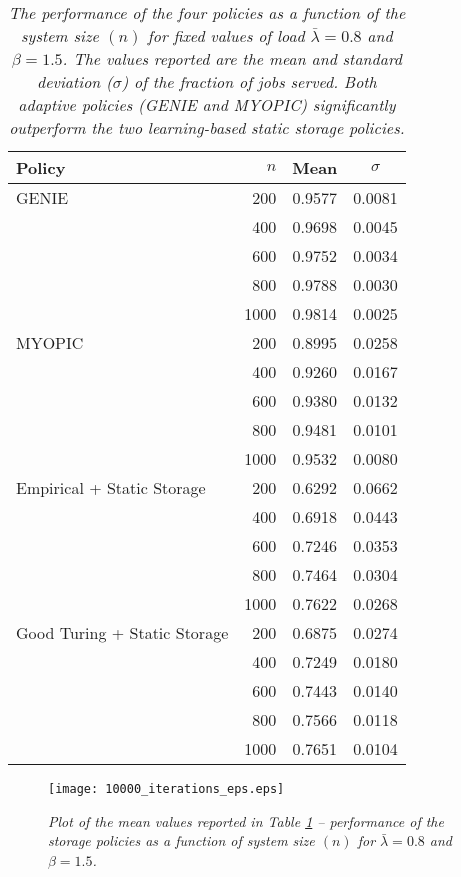 \documentclass[10pt, conference, letterpaper]{IEEEtran}
\begin{document}
\begin{table}[h]
	
	\centering
	\begin{tabular}{l r c c }
		\hline\hline
		Policy & $n$ & Mean & $\sigma$ \\ [0.5ex] \hline GENIE & 200 & 0.9577 & 0.0081  \\
		& 400 & 0.9698 & 0.0045 \\
		& 600 & 0.9752 & 0.0034 \\
		& 800 & 0.9788 & 0.0030 \\
		& 1000 & 0.9814 & 0.0025 \\
		\hline
		MYOPIC & 200 & 0.8995  & 0.0258 \\
		& 400 & 0.9260  & 0.0167  \\
		& 600 & 0.9380  & 0.0132 \\
		& 800 & 0.9481  & 0.0101 \\
		& 1000 & 0.9532 & 0.0080 \\
		\hline
		Empirical + Static Storage & 200 & 0.6292 & 0.0662  \\
		& 400 & 0.6918 & 0.0443 \\
		& 600 & 0.7246 & 0.0353 \\
		& 800 & 0.7464 & 0.0304 \\
		& 1000 & 0.7622 & 0.0268 \\
		\hline
		Good Turing + Static Storage & 200 & 0.6875 & 0.0274  \\
		& 400 & 0.7249 & 0.0180  \\
		& 600 & 0.7443 & 0.0140 \\
		& 800 & 0.7566 & 0.0118 \\
		& 1000 & 0.7651 & 0.0104 \\
		\hline
	\end{tabular}
	\caption{\sl The performance of the four policies as a function of the system size $(n)$ for fixed values of load $\bar{\lambda} = 0.8$ and $\beta = 1.5$. The values reported are the mean and standard deviation ($\sigma$) of the fraction of jobs served. Both adaptive policies (GENIE and MYOPIC) significantly outperform the two learning-based static storage policies.}
	
	\label{table:diff_n} \end{table}

\begin{figure}[h]
	\begin{center}
		\texttt{[image: 10000\_iterations\_eps.eps]}
		\caption{\sl Plot of the mean values reported in Table \ref{table:diff_n} -- performance of the storage policies as a function of system size $(n)$ for $\bar{\lambda} = 0.8$ and $\beta = 1.5$. \label{fig:diff_n}}
	\end{center}
\end{figure}
\end{document}
